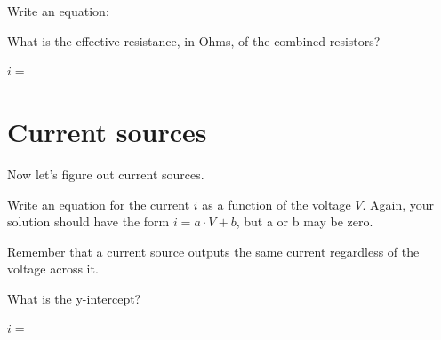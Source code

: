 \documentclass{ximera}
\begin{document}
\begin{exercise}
Write an equation:
\begin{solution}
  \begin{hint}
  \begin{prompt}
    What is the effective resistance, in Ohms, of the combined resistors? 
  \end{prompt}
  \end{hint}

  $i = $ 
\end{solution}
\end{exercise}

\section{Current sources}
Now let's figure out current sources.
\begin{exercise}
Write an equation for the current $i$ as a function of the voltage $V$.  Again, your solution should have the form $i = a \cdot V + b$, but a or b may be zero.

\begin{solution}
  \begin{hint}
    Remember that a current source outputs the same current regardless of the voltage across it.
  \end{hint}
  \begin{hint}
  \begin{prompt}
    What is the y-intercept? 
  \end{prompt}
  \end{hint}
 
  $i = $ 
\end{solution}

\end{exercise}



\end{document}
